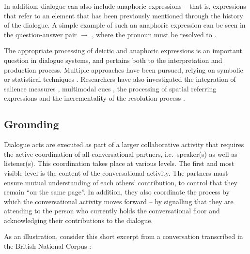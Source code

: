 In addition, dialogue can also include anaphoric expressions -- that is, expressions that refer to an element that has been previously mentioned through the history of the dialogue. A simple example of such an anaphoric expression can be seen in the question-answer pair  $\rightarrow$ , where the pronoun  must be resolved to . 

The appropriate processing of deictic and anaphoric expressions is an important question in dialogue systems, and pertains both to the interpretation and production process. Multiple approaches have been pursued, relying on symbolic \citep{Eckert2000} or statistical techniques \citep{StrubeM03,Stent2010}.  Researchers have also investigated the integration of salience measures \citep{Kelleher:2004}, multimodal cues \citep{Frampton:2009,Chen:2011}, the processing of spatial referring expressions \citep{zender/etal:2009-ijcai} and the incrementality of the resolution process \citep{schlangen2009incremental,poesio2011incremental}. 

\subsection{Grounding}

Dialogue acts are executed as part of a larger collaborative activity that requires the active coordination of all conversational partners, i.e.\ speaker(s) as well as listener(s).  This coordination takes place at various levels.  The first and most visible level is the content of the conversational activity.   The partners must ensure mutual understanding of each others' contribution, to control that they remain ``on the same page''.  In addition, they also coordinate the process by which the conversational activity moves forward -- by signalling that they are attending to the person who currently holds the conversational floor and acknowledging their contributions to the dialogue.

As an illustration, consider this short excerpt from a conversation transcribed in the British National Corpus \citep{bnc}:

